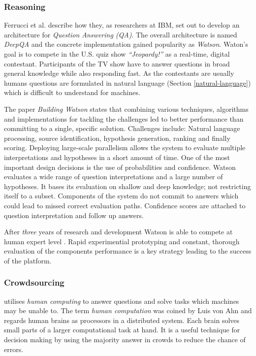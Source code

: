 \subsubsection{Reasoning} \label{reasoning}
Ferrucci et al. \cite{Ferrucci2010b} describe how they, as researchers at IBM, set out to develop an architecture for \textit{Question Answering (QA)}.
The overall architecture is named \textit{DeepQA} and the concrete implementation gained popularity as \textit{Watson}.
Waton's goal is to compete in the U.S. quiz show \textit{\enquote{Jeopardy!}} as a real-time, digital contestant.
Participants of the TV show have to answer questions in broad general knowledge while also responding fast.
As the contestants are usually humans questions are formulated in natural language (Section \ref{natural-language}) which is difficult to understand for machines.

The paper \textit{Building Watson} \cite{Ferrucci2010b} states that combining various techniques, algorithms and implementations for tackling the challenges led to better performance than committing to a single, specific solution.
Challenges include: Natural language processing, source identification, hypothesis generation, ranking and finally scoring.
Deploying large-scale parallelism allows the system to evaluate multiple interpretations and hypotheses in a short amount of time.
One of the most important design decisions is the use of probabilities and confidence.
Watson evaluates a wide range of question interpretations and a large number of hypotheses.
It bases its evaluation on shallow and deep knowledge; not restricting itself to a subset.
Components of the system do not commit to answers which could lead to missed correct evaluation paths.
Confidence scores are attached to question interpretation and follow up answers.

After \textit{three} years of research and development Watson is able to compete at human expert level \cite{Ferrucci2010b}.
Rapid experimential prototyping and constant, thorough evaluation of the components performance is a key strategy leading to the success of the platform.

\subsubsection{Crowdsourcing} \label{crowdsourcing}
utilises \textit{human computing} to answer questions and solve tasks which machines may be unable to.
The term \textit{human computation} was coined by Luis von Ahn \cite{Law2005HumanComputation} and regards human brains as processors in a distributed system.
Each brain solves small parts of a larger computational task at hand.
It is a useful technique for decision making by using the majority answer in crowds to reduce the chance of errors.

